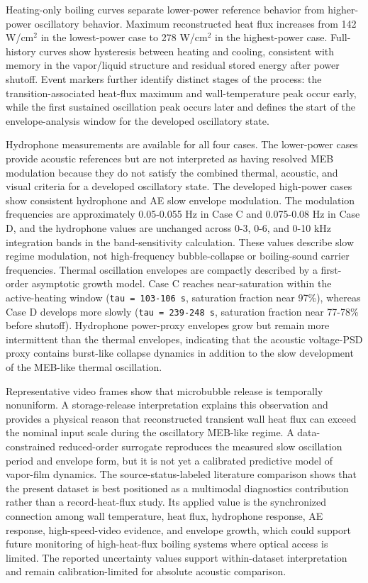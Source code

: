\documentclass[final,1p,times]{elsarticle}
\begin{document}
Heating-only boiling curves separate lower-power reference behavior from higher-power oscillatory behavior. Maximum reconstructed heat flux increases from 142 W/cm$^2$ in the lowest-power case to 278 W/cm$^2$ in the highest-power case. Full-history curves show hysteresis between heating and cooling, consistent with memory in the vapor/liquid structure and residual stored energy after power shutoff. Event markers further identify distinct stages of the process: the transition-associated heat-flux maximum and wall-temperature peak occur early, while the first sustained oscillation peak occurs later and defines the start of the envelope-analysis window for the developed oscillatory state.

Hydrophone measurements are available for all four cases. The lower-power cases provide acoustic references but are not interpreted as having resolved MEB modulation because they do not satisfy the combined thermal, acoustic, and visual criteria for a developed oscillatory state. The developed high-power cases show consistent hydrophone and AE slow envelope modulation. The modulation frequencies are approximately 0.05-0.055 Hz in Case C and 0.075-0.08 Hz in Case D, and the hydrophone values are unchanged across 0-3, 0-6, and 0-10 kHz integration bands in the band-sensitivity calculation. These values describe slow regime modulation, not high-frequency bubble-collapse or boiling-sound carrier frequencies. Thermal oscillation envelopes are compactly described by a first-order asymptotic growth model. Case C reaches near-saturation within the active-heating window (\texttt{tau = 103-106 s}, saturation fraction near 97\%), whereas Case D develops more slowly (\texttt{tau = 239-248 s}, saturation fraction near 77-78\% before shutoff). Hydrophone power-proxy envelopes grow but remain more intermittent than the thermal envelopes, indicating that the acoustic voltage-PSD proxy contains burst-like collapse dynamics in addition to the slow development of the MEB-like thermal oscillation.

Representative video frames show that microbubble release is temporally nonuniform. A storage-release interpretation explains this observation and provides a physical reason that reconstructed transient wall heat flux can exceed the nominal input scale during the oscillatory MEB-like regime. A data-constrained reduced-order surrogate reproduces the measured slow oscillation period and envelope form, but it is not yet a calibrated predictive model of vapor-film dynamics. The source-status-labeled literature comparison shows that the present dataset is best positioned as a multimodal diagnostics contribution rather than a record-heat-flux study. Its applied value is the synchronized connection among wall temperature, heat flux, hydrophone response, AE response, high-speed-video evidence, and envelope growth, which could support future monitoring of high-heat-flux boiling systems where optical access is limited. The reported uncertainty values support within-dataset interpretation and remain calibration-limited for absolute acoustic comparison.
\end{document}
